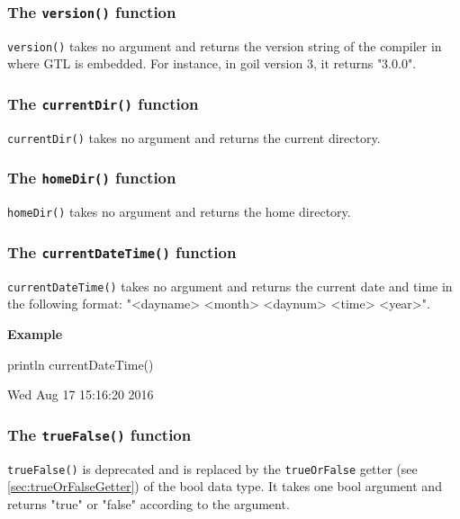 \documentclass[10pt,openright,twosides,final]{memoir}
\newcommand{\gtltype}[1]{{\small\ttfamily #1}}
\newcommand{\scst}[1]{{\footnotesize\ttfamily\colorbox{light-blue}{"#1"}}}
\newcommand{\gtlinline}[1]{\colorbox{light-blue}{\lstinline[language=gtl]{#1}}}
\newcommand{\example}{\vspace{.75em}\noindent\textbf{Example}\vspace{0em}}
\begin{document}
\subsubsection{The \texttt{version()} function}

\gtlinline{version()} takes no argument and returns the version string of the compiler in where GTL is embedded. For instance, in goil version 3, it returns \scst{3.0.0}.

\subsubsection{The \texttt{currentDir()} function}

\gtlinline{currentDir()} takes no argument and returns the current directory.

\subsubsection{The \texttt{homeDir()} function}

\gtlinline{homeDir()} takes no argument and returns the home directory.

\subsubsection{The \texttt{currentDateTime()} function}

\gtlinline{currentDateTime()} takes no argument and returns the current date and time in the following format: \scst{<dayname> <month> <daynum> <time> <year>}.

\example
\begin{gtl}
println currentDateTime()
\end{gtl}
\begin{console}
Wed Aug 17 15:16:20 2016
\end{console}

\subsubsection{The \texttt{trueFalse()} function}

\gtlinline{trueFalse()} is deprecated and is replaced by the \gtlinline{trueOrFalse} getter (see \ref{sec:trueOrFalseGetter}) of the \gtltype{bool} data type. It takes one bool argument and returns \scst{true} or \scst{false} according to the argument.
\end{document}
